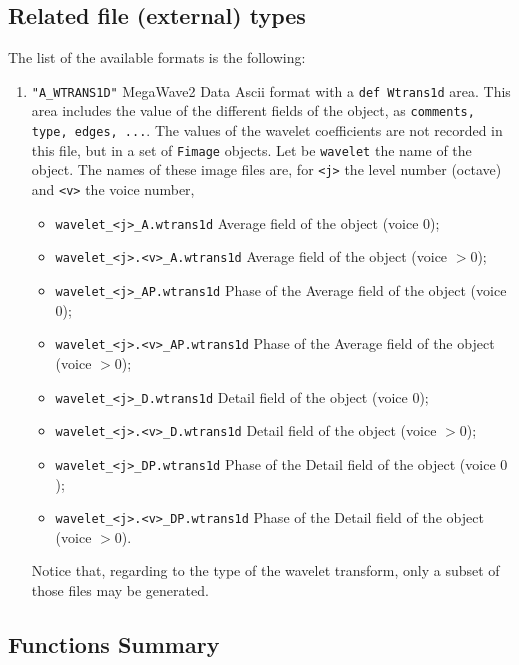 \subsection{Related file (external) types}
\label{wavelets_wtrans1d-file_type}

The list of the available formats is the following:
\begin{enumerate}
\item \verb+"A_WTRANS1D"+ MegaWave2 Data Ascii format with a \verb+def Wtrans1d+ area.
This area includes the value of the different fields of the object, as
\verb+comments, type, edges, ...+. 
The values of the wavelet coefficients are not recorded in this file, but in 
a set of \verb+Fimage+ objects.
Let be \verb+wavelet+ the name of the object. 
The names of these image files are, for \verb+<j>+ the level number (octave)
and \verb+<v>+ the voice number,
\begin{itemize} 
\item \verb+wavelet_<j>_A.wtrans1d+ Average field of the object (voice $0$);
\item \verb+wavelet_<j>.<v>_A.wtrans1d+ Average field of the object (voice $> 0$);
\item \verb+wavelet_<j>_AP.wtrans1d+ Phase of the Average field of the object (voice $0$);
\item \verb+wavelet_<j>.<v>_AP.wtrans1d+ Phase of the Average field of the object (voice $> 0$);
\item \verb+wavelet_<j>_D.wtrans1d+ Detail field of the object (voice $0$);
\item \verb+wavelet_<j>.<v>_D.wtrans1d+ Detail field of the object (voice $> 0$);
\item \verb+wavelet_<j>_DP.wtrans1d+ Phase of the Detail field of the object (voice $0$);
\item \verb+wavelet_<j>.<v>_DP.wtrans1d+ Phase of the Detail field of the object (voice $> 0$).
\end{itemize}
Notice that, regarding to the type of the wavelet transform, only a subset of those files may be generated.
\end{enumerate}

\subsection{Functions Summary}
\label{wavelets_wtrans1d_function}


